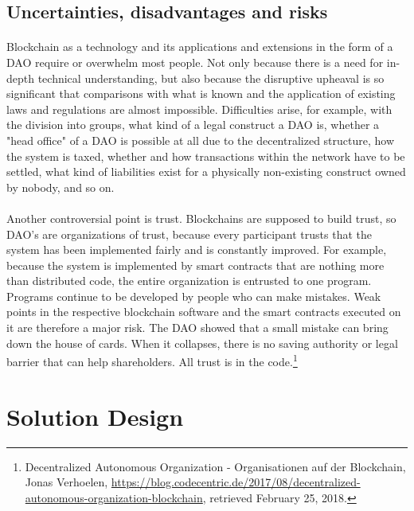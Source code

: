 \documentclass{scrartcl}
\begin{document}
	\subsection{Uncertainties, disadvantages and risks}
	
	\paragraph{}
	Blockchain as a technology and its applications and extensions in the form of a DAO require or overwhelm most people.  Not only because there is a need for in-depth technical understanding, but also because the disruptive upheaval is so significant that comparisons with what is known and the application of existing laws and regulations are almost impossible. Difficulties arise, for example, with the division into groups, what kind of a legal construct a DAO is, whether a "head office" of a DAO is possible at all due to the decentralized structure, how the system is taxed, whether and how transactions within the network have to be settled, what kind of liabilities exist for a physically non-existing construct owned by nobody, and so on.
	
	\paragraph{}
	Another controversial point is trust. Blockchains are supposed to build trust, so DAO's are organizations of trust, because every participant trusts that the system has been implemented fairly and is constantly improved. For example, because the system is implemented by smart contracts that are nothing more than distributed code, the entire organization is entrusted to one program. Programs continue to be developed by people who can make mistakes. Weak points in the respective blockchain software and the smart contracts executed on it are therefore a major risk. The DAO showed that a small mistake can bring down the house of cards. When it collapses, there is no saving authority or legal barrier that can help shareholders. All trust is in the code.\footnote{Decentralized Autonomous Organization - Organisationen auf der Blockchain, Jonas Verhoelen, \url{https://blog.codecentric.de/2017/08/decentralized-autonomous-organization-blockchain}, retrieved February 25, 2018.}
    
\section{Solution Design}
   
\end{document}

